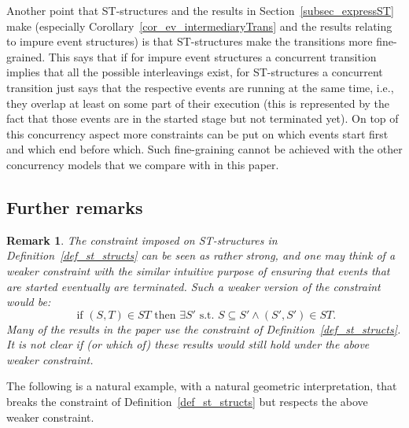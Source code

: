 \documentclass[submission,copyright,creativecommons]{eptcs}
\newtheorem{remark}[theorem]{Remark}
\begin{document}
Another point that ST-structures and the results in Section~\ref{subsec_expressST} make (especially Corollary~\ref{cor_ev_intermediaryTrans} and the results relating to impure event structures) is that ST-structures make the transitions more fine-grained. This says that if for impure event structures a concurrent transition implies that all the possible interleavings exist, for ST-structures a concurrent transition just says that the respective events are running at the same time, i.e., they overlap at least on some part of their execution (this is represented by the fact that those events are in the started stage but not terminated yet). On top of this concurrency aspect more constraints can be put on which events start first and which end before which. Such fine-graining cannot be achieved with the other concurrency models that we compare with in this paper.


\subsection{Further remarks}



\begin{remark}\label{remark_weak_ST_constraint}
The constraint imposed on ST-structures in Definition~\ref{def_st_structs} can be seen as rather strong, and one may think of a weaker constraint with the similar intuitive purpose of ensuring that events that are started eventually are terminated. Such a weaker version of the constraint would be:
\[
\mbox{ if } (S,T)\in ST \mbox{ then }\exists S' \mbox{ s.t.\ }S\subseteq S'\wedge(S',S')\in ST.
\]
Many of the results in the paper use the constraint of Definition~\ref{def_st_structs}. It is not clear if (or which of) these results would still hold under the above weaker constraint.
\end{remark}


The following is a natural example, with a natural geometric interpretation, that breaks the constraint of Definition~\ref{def_st_structs} but respects the above weaker constraint.
\end{document}

